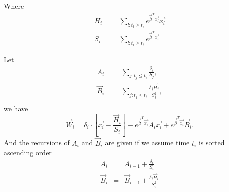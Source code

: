 Where
\begin{eqnarray*}
H_i &=&  \sum_{l: t_l \ge t_i} e^{\vec{\beta}^T \vec{x_l}} \vec{x_l}\\
S_i &=& \sum_{l: t_l \ge t_i} e^{\vec{\beta}^T \vec{x_l}}
\end{eqnarray*}

Let
\begin{eqnarray*}
    A_i &=& \sum_{j: t_j \le t_i} \frac{\delta_j}{S_j},\\
    \vec{B}_i &=& \sum_{j: t_j \le t_i} \frac{\delta_j \vec{H}_j}{S_j^2},\\
\end{eqnarray*}
we have
\[
\vec{W}_i = \delta_i \cdot \left[ \vec{x_i} - \frac{\vec{H}_i}{S_i} \right] - e^{\vec{\beta}^T \vec{x_i}} A_i \vec{x_i} + e^{\vec{\beta}^T \vec{x_i}} \vec{B}_i.
\]
And the recursions of $A_i$ and $\vec{B}_i$ are given if we assume time $t_i$ is sorted ascending order
\begin{eqnarray*}
    A_i &=& A_{i-1} + \frac{\delta_i}{S_i}\\
    \vec{B}_i &=& \vec{B}_{i-1} + \frac{\delta_i \vec{H}_i}{S_i^2}
\end{eqnarray*}
